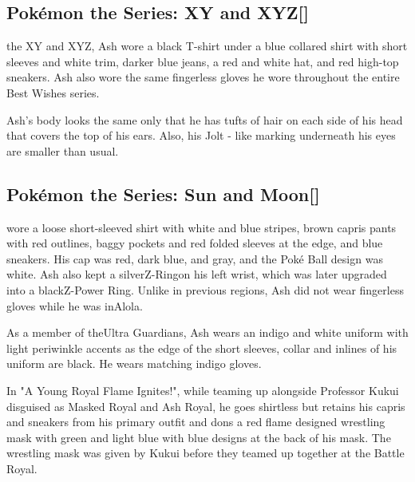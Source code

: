 \documentclass[a4paper,12pt]{article}
\begin{document}
\subsection*{Pokémon the Series: XY and XYZ[]}\n\nIn the XY and XYZ, Ash wore a black T-shirt under a blue collared shirt with short sleeves and white trim, darker blue jeans, a red and white hat, and red high-top sneakers. Ash also wore the same fingerless gloves he wore throughout the entire Best Wishes series.\\ \par \vspace{0.5cm}

Ash's body looks the same only that he has tufts of hair on each side of his head that covers the top of his ears. Also, his Jolt - like marking underneath his eyes are smaller than usual.\\ \par \vspace{0.5cm}

\subsection*{Pokémon the Series: Sun and Moon[]}\n\nAsh wore a loose short-sleeved shirt with white and blue stripes, brown capris pants with red outlines, baggy pockets and red folded sleeves at the edge, and blue sneakers. His cap was red, dark blue, and gray, and the Poké Ball design was white. Ash also kept a silverZ-Ringon his left wrist, which was later upgraded into a blackZ-Power Ring. Unlike in previous regions, Ash did not wear fingerless gloves while he was inAlola.\\ \par \vspace{0.5cm}

As a member of theUltra Guardians, Ash wears an indigo and white uniform with light periwinkle accents as the edge of the short sleeves, collar and inlines of his uniform are black. He wears matching indigo gloves.\\ \par \vspace{0.5cm}

In "A Young Royal Flame Ignites!", while teaming up alongside Professor Kukui disguised as Masked Royal and Ash Royal, he goes shirtless but retains his capris and sneakers from his primary outfit and dons a red flame designed wrestling mask with green and light blue with blue designs at the back of his mask. The wrestling mask was given by Kukui before they teamed up together at the Battle Royal.\\ \par \vspace{0.5cm}
\end{document}
